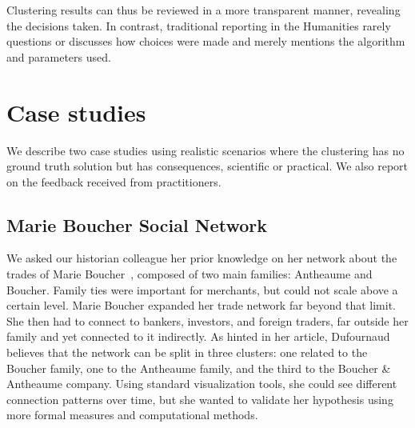 Clustering results can thus be reviewed in a more transparent manner, revealing the decisions taken. In contrast, traditional reporting in the Humanities rarely questions or discusses how choices were made and merely mentions the  algorithm and parameters used.


\section{Case studies}

We describe two case studies using realistic scenarios where the clustering has no ground truth solution but has consequences, scientific or practical. We also report on the feedback received from practitioners.

\subsection{Marie Boucher Social Network}
\label{sud:MB}

We asked our historian colleague her prior knowledge on her network about the trades of Marie Boucher~\cite{Dufournaud17},  %
composed of two main families: Antheaume and Boucher. Family ties were important for merchants, but could not scale above a certain level. Marie Boucher expanded her trade network far beyond that limit. She then had to connect to bankers, investors, and foreign traders, far outside her family and yet connected to it indirectly. %
As hinted in her article, Dufournaud believes that the network can be split in three clusters: one related to the Boucher family, one to the Antheaume family, and the third to the Boucher \& Antheaume company. Using standard visualization tools, she could see different connection patterns over time, but she wanted to validate her hypothesis using more formal measures and computational methods.



